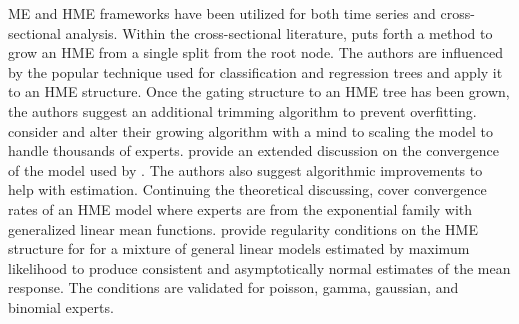 \documentclass[12pt]{article}
\begin{document}
ME and HME frameworks have been utilized for both time series and
cross-sectional analysis. Within the cross-sectional literature,
\cite{WaterhouseRobinson1995} puts forth a method to grow an HME from a       %
single split from the root node. The authors are influenced by the popular
technique used for classification and regression trees \cite{CART1984} and  %
apply it to an HME structure. Once the gating structure to an HME tree has    
been grown, the authors suggest an additional trimming algorithm to prevent overfitting.   %
\cite{FFW1997} consider \cite{WaterhouseRobinson1995} and alter their       %
growing algorithm with a mind to scaling the model to handle thousands of
experts. \cite{JordanXuConverge1995} provide an extended discussion on the convergence of the %
model used by \cite{JordanJacobs1993}. The authors also suggest
algorithmic improvements to help with estimation. Continuing the theoretical
discussing, \cite{JiangTanner1999} cover convergence rates of an HME model where experts
are from the exponential family with generalized linear mean functions.
\cite{JiangTanner2000} provide regularity conditions on the HME structure for
for a mixture of general linear models estimated by maximum likelihood to
produce consistent and asymptotically normal estimates of the mean response.
The conditions are validated for poisson, gamma, gaussian, and binomial experts.

\bigskip
\end{document}
